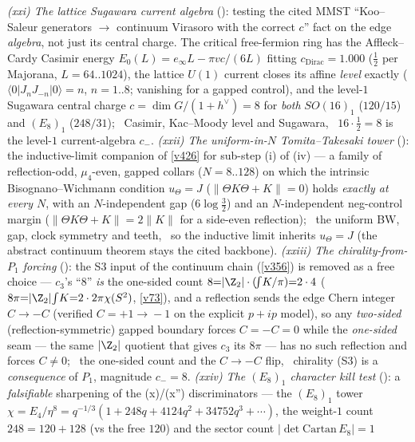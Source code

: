 \emph{(xxi) The lattice Sugawara current algebra} (): testing the cited MMST
``Koo--Saleur generators $\to$ continuum Virasoro with the correct $c$'' fact on the edge \emph{algebra}, not just
its central charge. The critical free-fermion ring has the Affleck--Cardy Casimir energy $E_0(L){=}e_\infty L{-}\pi v
c/(6L)$ fitting $c_{\mathrm{Dirac}}{=}1.000$ ($\tfrac12$ per Majorana, $L{=}64..1024$), the lattice $U(1)$ current
closes its affine \emph{level} exactly ($\langle0|J_nJ_{-n}|0\rangle{=}n$, $n{=}1..8$; vanishing for a gapped
control), and the level-$1$ Sugawara central charge $c{=}\dim G/(1{+}h^\vee){=}8$ for \emph{both} $SO(16)_1$
($120/15$) and $(E_8)_1$ ($248/31$); \mE\ Casimir, Kac--Moody level and Sugawara, \mC\ $16{\cdot}\tfrac12{=}8$ is the
level-$1$ current-algebra $c_-$. \emph{(xxii) The uniform-in-$N$ Tomita--Takesaki tower}
(): the inductive-limit companion of \vref{v426} for sub-step (i) of (iv) --- a
family of reflection-odd, $\mu_4$-even, gapped collars ($N{=}8..128$) on which the intrinsic Bisognano--Wichmann
condition $u_\Theta{=}J$ ($\|\Theta K\Theta{+}K\|{=}0$) holds \emph{exactly at every $N$}, with an $N$-independent gap
($6\log\tfrac32$) and an $N$-independent neg-control margin ($\|\Theta K\Theta{+}K\|{=}2\|K\|$ for a side-even
reflection); \mE\ the uniform BW, gap, clock symmetry and teeth, \mC\mO\ so the inductive limit inherits
$u_\Theta{=}J$ (the abstract continuum theorem stays the cited backbone). \emph{(xxiii) The chirality-from-$P_1$
forcing} (): the S3 input of the continuum chain (\vref{v356}) is removed as
a free choice --- $c_3$'s ``$8$'' \emph{is} the one-sided count $8{=}|\Z_2|\cdot(\!\int\!K/\pi){=}2\cdot4$
($8\pi{=}|\Z_2|\!\int\!K{=}2\cdot2\pi\chi(S^2)$, \vref{v73}), and a reflection sends the edge Chern integer
$C{\to}{-}C$ (verified $C{=}{+}1\!\to\!{-}1$ on the explicit $p{+}ip$ model), so any \emph{two-sided}
(reflection-symmetric) gapped boundary forces $C{=}{-}C{=}0$ while the \emph{one-sided} seam --- the same $|\Z_2|$
quotient that gives $c_3$ its $8\pi$ --- has no such reflection and forces $C{\neq}0$; \mE\ the one-sided count and
the $C{\to}{-}C$ flip, \mC\ chirality (S3) is a \emph{consequence} of $P_1$, magnitude $c_-{=}8$. \emph{(xxiv) The
$(E_8)_1$ character kill test} (): a \emph{falsifiable} sharpening of the
(x)/(x'') discriminators --- the $(E_8)_1$ tower $\chi{=}E_4/\eta^8{=}q^{-1/3}(1{+}248q{+}4124q^2{+}34752q^3{+}\cdots)$,
the weight-$1$ count $248{=}120{+}128$ (vs the free $120$) and the sector count $|\!\det\mathrm{Cartan}\,E_8|{=}1$
